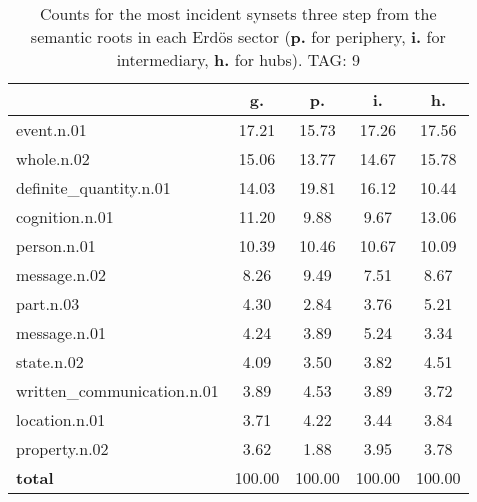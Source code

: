 \begin{table}[h!]
\begin{center}
\begin{tabular}{| l || c | c | c | c |}\hline
 & {\bf g.} & {\bf p.} & {\bf i.} & {\bf h.} \\\hline\hline
event.n.01 & 17.21  & 15.73  & 17.26  & 17.56 \\\hline
whole.n.02 & 15.06  & 13.77  & 14.67  & 15.78 \\\hline
definite\_quantity.n.01 & 14.03  & 19.81  & 16.12  & 10.44 \\\hline
cognition.n.01 & 11.20  & 9.88  & 9.67  & 13.06 \\\hline
person.n.01 & 10.39  & 10.46  & 10.67  & 10.09 \\\hline
message.n.02 & 8.26  & 9.49  & 7.51  & 8.67 \\\hline
part.n.03 & 4.30  & 2.84  & 3.76  & 5.21 \\\hline
message.n.01 & 4.24  & 3.89  & 5.24  & 3.34 \\\hline
state.n.02 & 4.09  & 3.50  & 3.82  & 4.51 \\\hline
written\_communication.n.01 & 3.89  & 4.53  & 3.89  & 3.72 \\\hline
location.n.01 & 3.71  & 4.22  & 3.44  & 3.84 \\\hline
property.n.02 & 3.62  & 1.88  & 3.95  & 3.78 \\\hline\hline
{{\bf total}} & 100.00  & 100.00  & 100.00  & 100.00 \\\hline
\end{tabular}
\caption{Counts for the most incident synsets three step from the semantic roots in each Erd\"os sector ({\bf p.} for periphery, {\bf i.} for intermediary, {\bf h.} for hubs). TAG: 9}
\end{center}
\end{table}